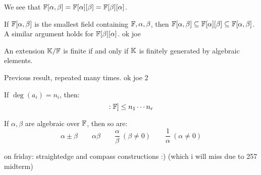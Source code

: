 \begin{lm}
    We see that $ \mathbb{F}[\alpha,\beta] = \mathbb{F}[\alpha][\beta]
    = \mathbb{F}[\beta][\alpha] $.
\end{lm}
\begin{pf}[source=Primary Source Material]
    If $ \mathbb{F}[\alpha, \beta] $ is the smallest field containing $ \mathbb{F},
    \alpha, \beta $, then $ \mathbb{F}[\alpha,\beta] \subseteq
    \mathbb{F}[\alpha][\beta] \subseteq \mathbb{F}[\alpha,\beta] $. A similar argument
    holds for $ \mathbb{F}[\beta][\alpha] $. ok joe
\end{pf}

\begin{thm}
    An extension $ \mathbb{K}/\mathbb{F} $ is finite if and only if $ \mathbb{K} $ is
    finitely generated by algebraic elements.
\end{thm}

\begin{pf}[source=Primary Source Material]
    Previous result, repeated many times. ok joe 2
\end{pf}

\begin{thm}
    If $ \deg(a_{i}) = n_{i} $, then:
    \begin{equation*}
        [\bb{F}[\alpha_{1},\dots,\alpha_{r}]:\bb{F}] \leq
        n_{1}\cdots n_{r}
    \end{equation*}
\end{thm}

\begin{crll}
    If $ \alpha, \beta $ are algebraic over $ \mathbb{F} $, then so are:
    \begin{equation*}
        \alpha \pm \beta \qquad \alpha\beta \qquad \frac{\alpha}{\beta} \
        (\beta \neq 0) \qquad \frac{1}{\alpha} \ (\alpha \neq 0)
    \end{equation*}
\end{crll}
on friday: straightedge and compass constructions :)
(which i will miss due to 257 midterm)


